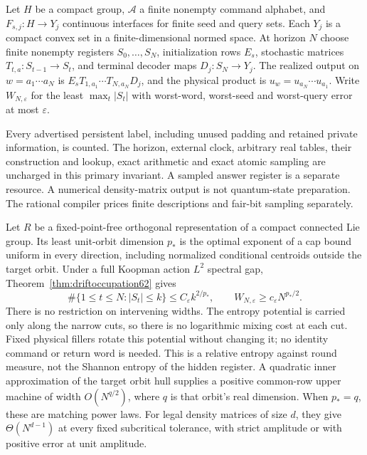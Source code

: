 \begin{definition}\label{def:machine54}
Let $H$ be a compact group, $\mathcal A$ a finite nonempty command
alphabet, and $F_{s,j}:H\to Y_j$ continuous interfaces for finite seed
and query sets. Each $Y_j$ is a compact convex set in a finite-dimensional
normed space. At horizon $N$ choose finite nonempty registers
$S_0,\ldots,S_N$, initialization rows $E_s$, stochastic matrices
$T_{t,a}:S_{t-1}\to S_t$, and terminal decoder maps $D_j:S_N\to Y_j$.
The realized output on $w=a_1\cdots a_N$ is
$E_sT_{1,a_1}\cdots T_{N,a_N}D_j$, and the physical product is
$u_w=u_{a_N}\cdots u_{a_1}$. Write $W_{N,\varepsilon}$ for the least
$\max_t|S_t|$ with worst-word, worst-seed and worst-query error at most
$\varepsilon$.
\end{definition}
Every advertised persistent label, including unused padding and retained
private information, is counted. The horizon, external clock, arbitrary
real tables, their construction and lookup, exact arithmetic and exact
atomic sampling are uncharged in this primary invariant. A sampled
answer register is a separate resource. A numerical density-matrix
output is not quantum-state preparation. The rational compiler prices
finite descriptions and fair-bit sampling separately.

Let $R$ be a fixed-point-free orthogonal representation of a compact
connected Lie group. Its least unit-orbit dimension $p_*$ is the optimal
exponent of a cap bound uniform in every direction, including normalized
conditional centroids outside the target orbit. Under a full Koopman action $L^2$ spectral
gap, Theorem~\ref{thm:driftoccupation62}
gives
\[
 \#\{1\le t\le N:|S_t|\le k\}\le C_\varepsilon k^{2/p_*},
 \qquad W_{N,\varepsilon}\ge c_\varepsilon N^{p_*/2}.
\]
There is no restriction on intervening widths. The entropy potential
is carried only along the narrow cuts, so there is no logarithmic
mixing cost at each cut. Fixed physical fillers rotate this potential
without changing it; no identity command or return word is needed.
This is a relative entropy against round measure, not the Shannon
entropy of the hidden register. A quadratic inner approximation of the target
orbit hull supplies a positive common-row upper machine of width
$O(N^{q/2})$, where $q$ is that orbit's real dimension. When $p_*=q$,
these are matching power laws. For legal density matrices of size $d$,
they give $\Theta(N^{d-1})$ at every fixed subcritical tolerance, with
strict amplitude or with positive error at unit amplitude.

